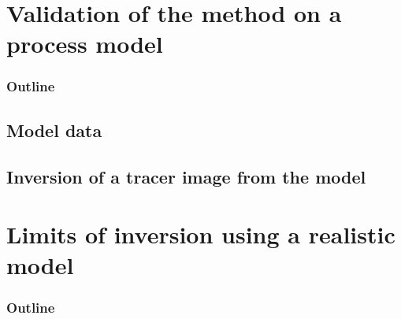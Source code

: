 \documentclass[compress,slidescentered,notes=show]{beamer}
\begin{document}
\begin{frame}
\end{frame}

\section[Process model data]{Validation of the method on a process model}
\begin{frame}
  \frametitle{Outline}
  \tableofcontents[currentsection]
\end{frame}


	\subsection{Model data}
\begin{frame}
\end{frame}

	\subsection{Inversion of a tracer image from the model}
\begin{frame}
\end{frame} 


\section[Realistic Model data]{Limits of inversion using a realistic model}
\begin{frame}
  \frametitle{Outline}
  \tableofcontents[currentsection]
\end{frame}
\end{document}
